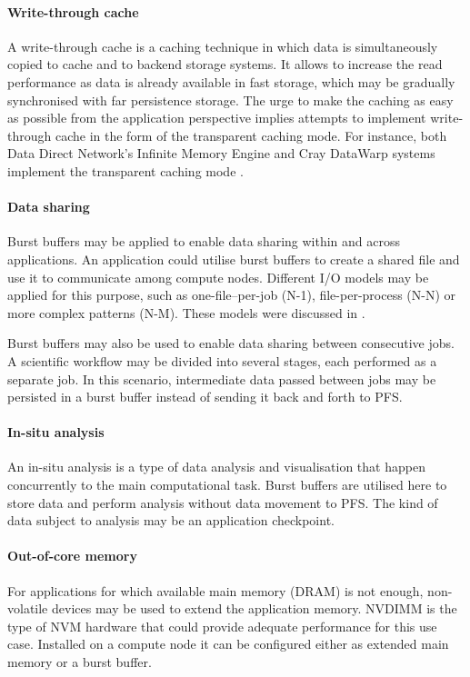 \documentclass[thesis-en.tex]{subfiles}
\begin{document}
\paragraph{Write-through cache}
A write-through cache is a caching technique in which data is simultaneously copied to cache and to backend storage systems. It allows to increase the read performance as data is already available in fast storage, which may be gradually synchronised with far persistence storage. The urge to make the caching as easy as possible from the application perspective implies attempts to implement write-through cache in the form of the transparent caching mode. For instance, both Data Direct Network's Infinite Memory Engine and Cray DataWarp systems implement the transparent caching mode \cite{lockwood-blog}.

\paragraph{Data sharing}
Burst buffers may be applied to enable data sharing within and across applications. An application could utilise burst buffers to create a shared file and use it to communicate among compute nodes. Different I/O models may be applied for this purpose, such as one-file--per-job (N-1), file-per-process (N-N) or more complex patterns (N-M). These models were discussed in \cite{7877147,6375580}.

Burst buffers may also be used to enable data sharing between consecutive jobs. A scientific workflow may be divided into several stages, each performed as a separate job. In this scenario, intermediate data passed between jobs may be persisted in a burst buffer instead of sending it back and forth to PFS.

\paragraph{In-situ analysis}
An in-situ analysis is a type of data analysis and visualisation that happen concurrently to the main computational task. Burst buffers are utilised here to store data and perform analysis without data movement to PFS. The kind of data subject to analysis may be an application checkpoint.

\paragraph{Out-of-core memory}
For applications for which available main memory (DRAM) is not enough, non-volatile devices may be used to extend the application memory. NVDIMM is the type of NVM hardware that could provide adequate performance for this use case. Installed on a compute node it can be configured either as extended main memory or a burst buffer.
\end{document}
